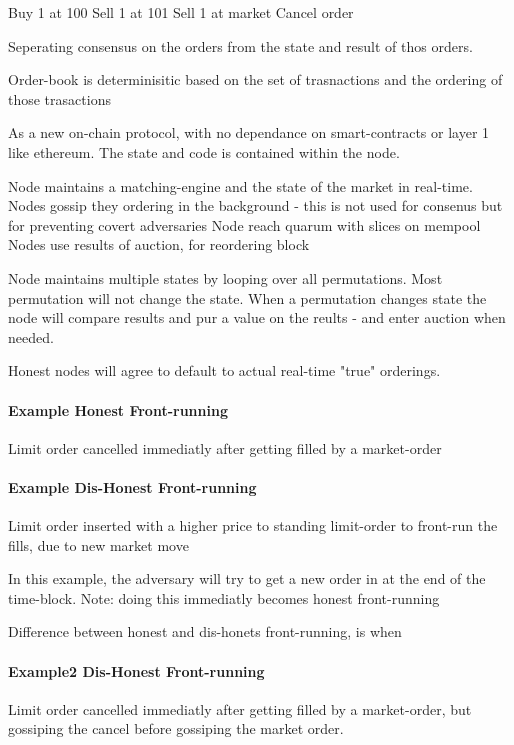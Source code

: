 \documentclass[12pt]{article}
\begin{document}
Buy 1 at 100
Sell 1 at 101 
Sell 1 at market
Cancel order 

Seperating consensus on the orders from the state and result of thos orders. 

Order-book is determinisitic based on the set of trasnactions and the ordering of those trasactions 

As a new on-chain protocol, with no dependance on smart-contracts or layer 1 like ethereum. The state and code is contained within the node. 

Node maintains a matching-engine and the state of the market in real-time. 
Nodes gossip they ordering in the background - this is not used for consenus but for preventing covert adversaries 
Node reach quarum with slices on mempool
Nodes use results of auction, for reordering block  

Node maintains multiple states by looping over all permutations. Most permutation will not change the state. 
When a permutation changes state the node will compare results and pur a value on the reults - and enter auction when needed. 

Honest nodes will agree to default to actual real-time "true" orderings. 

\paragraph*{Example Honest Front-running} 
Limit order cancelled immediatly after getting filled by a market-order 

\paragraph*{Example Dis-Honest Front-running} 
Limit order inserted with a higher price to standing limit-order to front-run the fills, due to new market move 

In this example, the adversary will try to get a new order in at the end of the time-block. 
Note: doing this immediatly becomes honest front-running 

Difference between honest and dis-honets front-running, is when 

\paragraph*{Example2 Dis-Honest Front-running} 
Limit order cancelled immediatly after getting filled by a market-order, but gossiping the cancel before gossiping the market order. 
\end{document}

